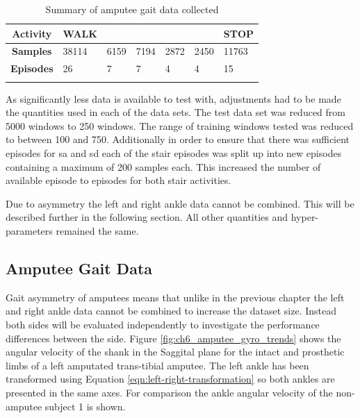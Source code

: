 \begin{table}[hbt]
    \centering
    \caption{Summary of amputee gait data collected}
    \label{tab:summary-of-episode-amputee-data}
    \begin{tabularx}{\textwidth}{c *{6}{Y}}
        \textbf{Activity} & WALK &  &  &  &  & STOP \\
        \hline
        \textbf{Samples} & 38114 & 6159 & 7194 & 2872 & 2450 & 11763 \\
        \textbf{Episodes} & 26 & 7 & 7 & 4 & 4 & 15 \\
         \\
    \end{tabularx}
\end{table}

As significantly less data is available to test with, adjustments had to be made the quantities used in each of the data sets. The test data set was reduced from 5000 windows to 250 windows. The range of training windows tested was reduced to between 100 and 750. Additionally in order to ensure that there was sufficient episodes for \acrshort{sa} and \acrshort{sd} each of the stair episodes was split up into new episodes containing a maximum of 200 samples each. This increased the number of available episode to episodes for both stair activities. 

Due to asymmetry the left and right ankle data cannot be combined. This will be described further in the following section. All other quantities and hyper-parameters remained the same.

\subsection{Amputee Gait Data}
Gait asymmetry of amputees means that unlike in the previous chapter the left and right ankle data cannot be combined to increase the dataset size. Instead both sides will be evaluated independently to investigate the performance differences between the side. Figure \ref{fig:ch6_amputee_gyro_trends} shows the angular velocity of the shank in the Saggital plane for the intact and prosthetic limbs of a left amputated trans-tibial amputee. The left ankle has been transformed using Equation \ref{eqn:left-right-transformation} so both ankles are presented in the same axes. For comparison the ankle angular velocity of the non-amputee subject 1 is shown.

